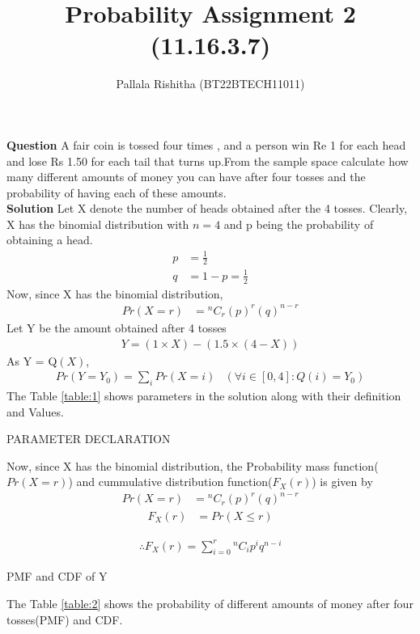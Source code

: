 \documentclass[12pt,onecolumn,notitlepage]{article}
\title{Probability Assignment 2 (11.16.3.7)}
\author{Pallala Rishitha (BT22BTECH11011)}
\date{}
\providecommand{\brak}[1]{\ensuremath{\left(#1\right)}}
\newcommand*{\comb}[2]{{}^{#1}C_{#2}}
\begin{document}
\maketitle
\textbf{Question}
A fair coin is tossed four times , and a person win Re 1 for each head and lose Rs 1.50 for each tail that turns up.From the sample space calculate how many different amounts of money you can have after four tosses and the
probability of having each of these amounts. \\
\textbf{Solution}
Let X denote the number of heads obtained after the 4 tosses. Clearly, X has the binomial distribution with $n=4$ and p being the probability of obtaining a head.
\begin{align}
    p &= \frac{1}{2} \\ 
    q &=1-p = \frac{1}{2}     
\end{align}
Now, since X has the binomial distribution,
\begin{align}
 Pr\brak{X=r} &= \comb{n}{r}\brak{p}^{r}\brak{q}^{n-r} 
\end{align}
Let Y be the amount obtained after 4 tosses
\begin{align}
    Y= (1\times X) - (1.5\times(4-X))
\end{align}
As Y = Q\brak{X},
\begin{align}
  Pr\brak{Y=Y_0} = \sum_i Pr\brak{X=i} &\brak{\forall i\in [0,4]:Q\brak{i}=Y_0} 
 \end{align}
 The Table \ref{table:1} shows parameters in the solution along with their definition and Values.\\
 \setlength{\tabcolsep}{16pt}
 \renewcommand{\arraystretch}{2.15}
 \begin{table}[h!]
\centering
\caption{PARAMETER DECLARATION}
\label{table:1}

\end{table}

Now, since X has the binomial distribution, the Probability mass function($Pr\brak{X=r}$) and  cummulative distribution function($F_X\brak{r}$) is given by
\begin{align}
 Pr\brak{X=r} &= \comb{n}{r}\brak{p}^{r}\brak{q}^{n-r} 
\end{align}
\begin{align}
    F_X\brak{r} &= Pr\brak{X \le r}
\end{align}

\begin{align}
    \therefore   F_X(r)=\sum_{i=0}^r\comb{n}{i}p^iq^{n-i}
\end{align}
 \setlength{\tabcolsep}{18pt}
 \renewcommand{\arraystretch}{2.15}
\begin{table}[h!]
\centering

\caption{PMF and CDF of Y}
\label{table:2}
\end{table}
The Table \ref{table:2} shows the probability of different amounts of money after four tosses(PMF) and CDF.\\
\end{document}
